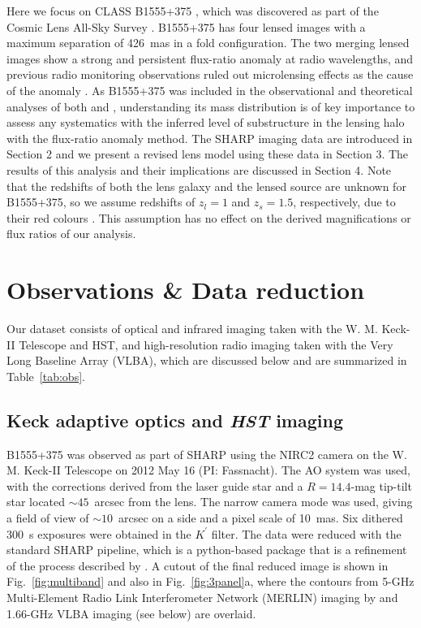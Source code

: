\documentclass[a4paper,fleqn,usenatbib,useAMS]{mnras}
\begin{document}
Here we focus on CLASS B1555+375 \citep{Marlow99}, which was discovered as part of the Cosmic Lens All-Sky Survey \citep{CLASS1,CLASS2}. B1555+375 has four lensed images with a maximum separation of 426~mas in a fold configuration.  The two merging lensed images show a strong and persistent flux-ratio anomaly at radio wavelengths, and previous radio monitoring observations ruled out microlensing effects as the cause of the anomaly \citep{K03}. As B1555+375 was included in the observational and theoretical analyses of both \citet{Dalal2002} and \citet{Xu15}, understanding its mass distribution is of key importance to assess any systematics with the inferred level of substructure in the lensing halo with the flux-ratio anomaly method. The SHARP imaging data are introduced in Section 2 and we present a revised lens model using these data in Section 3. The results of this analysis and their implications are discussed in Section 4. Note that the redshifts of both the lens galaxy and the lensed source are unknown for B1555+375, so we assume redshifts of $z_l = 1$ and $z_s = 1.5$, respectively, due to their red colours \citep{Marlow99}. This assumption has no effect on the derived magnifications or flux ratios of our analysis.

\section{Observations \& Data reduction}

Our dataset consists of optical and infrared imaging taken with the W. M. Keck-II Telescope and HST, and high-resolution radio imaging taken with the Very Long Baseline Array (VLBA), which are discussed below and are summarized in Table~\ref{tab:obs}.

\subsection{Keck adaptive optics and {\it HST} imaging}

B1555+375 was observed as part of SHARP using the NIRC2 camera on the W. M. Keck-II Telescope on 2012 May 16 (PI: Fassnacht).  The AO system was used, with the corrections derived from the laser guide star and a $R=14.4$-mag tip-tilt star located $\sim45$~arcsec from the lens.  The narrow camera mode was used, giving a field of view of $\sim10$~arcsec on a side and a pixel scale of 10~mas. Six dithered 300~s exposures were obtained in the $K^{\prime}$ filter.  The data were reduced with the standard SHARP pipeline, which is a python-based package that is a refinement of the process described by \citet{Auger_EELS1}.  A cutout of the final reduced image is shown in Fig.~\ref{fig:multiband} and also in Fig.~\ref{fig:3panel}a, where the contours from 5-GHz Multi-Element Radio Link Interferometer Network (MERLIN) imaging by \citet{Marlow99} and 1.66-GHz VLBA imaging (see below) are overlaid.
\end{document}
